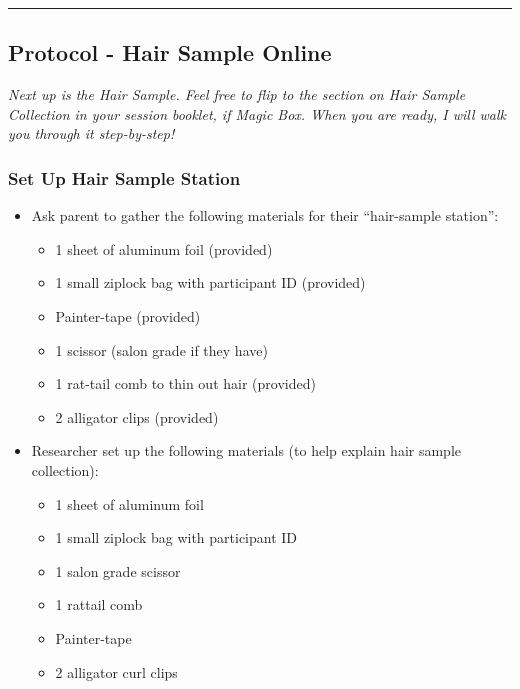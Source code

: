 \documentclass[]{book}
\begin{document}
\begin{center}\rule{0.5\linewidth}{0.5pt}\end{center}

\hypertarget{protocol---hair-sample-online-1}{%
\subsection{Protocol - Hair Sample Online}\label{protocol---hair-sample-online-1}}

\emph{Next up is the Hair Sample. Feel free to flip to the section on Hair Sample Collection in your session booklet, if Magic Box. When you are ready, I will walk you through it step-by-step!}

\hypertarget{set-up-hair-sample-station-2}{%
\subsubsection{Set Up Hair Sample Station}\label{set-up-hair-sample-station-2}}

\begin{itemize}
\item
  Ask parent to gather the following materials for their ``hair-sample station'':

  \begin{itemize}
  \item
    1 sheet of aluminum foil (provided)
  \item
    1 small ziplock bag with participant ID (provided)
  \item
    Painter-tape (provided)
  \item
    1 scissor (salon grade if they have)
  \item
    1 rat-tail comb to thin out hair (provided)
  \item
    2 alligator clips (provided)
  \end{itemize}
\item
  Researcher set up the following materials (to help explain hair sample collection):

  \begin{itemize}
  \item
    1 sheet of aluminum foil
  \item
    1 small ziplock bag with participant ID
  \item
    1 salon grade scissor
  \item
    1 rattail comb
  \item
    Painter-tape
  \item
    2 alligator curl clips
  \end{itemize}
\end{itemize}
\end{document}
